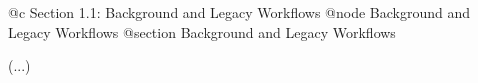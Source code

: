 @c Section 1.1: Background and Legacy Workflows
@node Background and Legacy Workflows
@section Background and Legacy Workflows

(...)
